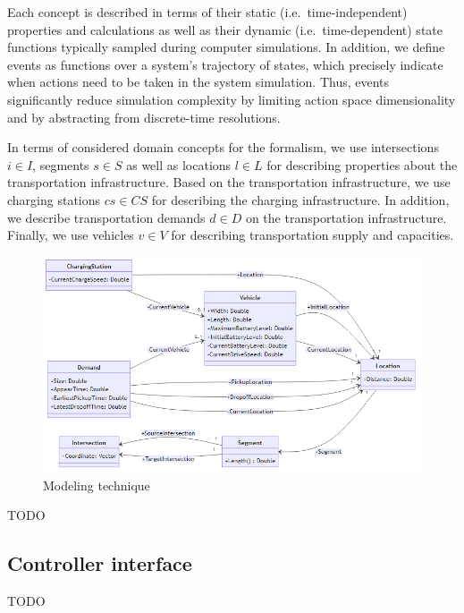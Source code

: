 \documentclass[10pt,twocolumn]{article}
\begin{document}
Each concept is described in terms of their static (i.e.\ time-independent) properties and calculations as well as their dynamic (i.e.\ time-dependent) state functions typically sampled during computer simulations. In addition, we define events as functions over a system's trajectory of states, which precisely indicate when actions need to be taken in the system simulation. Thus, events significantly reduce simulation complexity by limiting action space dimensionality and by abstracting from discrete-time resolutions. 

In terms of considered domain concepts for the formalism, we use intersections $i \in I$, segments $s \in S$ as well as locations $l \in L$ for describing properties about the transportation infrastructure.
Based on the transportation infrastructure, we use charging stations $cs \in CS$ for describing the charging infrastructure. In addition, we describe transportation demands $d \in D$ on the transportation infrastructure. 
Finally, we use vehicles $v \in V$ for describing transportation supply and capacities.


\begin{figure}[tbp]
    \includegraphics[width=\textwidth]{../../diagrams/model/classes-v0.1.png}
    \caption{Modeling technique}
    \label{fig:modeling-technique}
\end{figure}

TODO

\subsection{Controller interface}
\label{sec:controller-interface}

TODO
\end{document}
